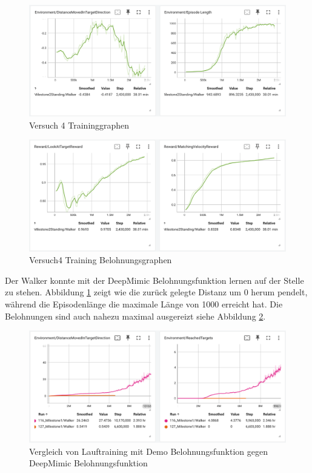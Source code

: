 \begin{figure}[H]
  \centering  
  \includegraphics[scale=0.5]{img/versuch4_training}
  \caption{Versuch 4 Traininggraphen}
  \label{fig:versuch4_training}
\end{figure}

\begin{figure}[H]
  \centering  
  \includegraphics[scale=0.5]{img/versuch4_training_belohnung}
  \caption{Versuch4 Training Belohnungsgraphen}
  \label{fig:versuch4_training_belohnung}
\end{figure}

Der Walker konnte mit der DeepMimic Belohnungsfunktion lernen auf der Stelle zu stehen.  Abbildung \ref{fig:versuch4_training} zeigt wie die zurück gelegte Distanz um 0 herum pendelt, während die Episodenlänge die maximale Länge von 1000 erreicht hat. Die Belohnungen sind auch nahezu maximal ausgereizt siehe Abbildung \ref{fig:versuch4_training_belohnung}.

\begin{figure}[H]
  \centering  
  \includegraphics[scale=0.5]{img/versuch4_laufen_vergleich.png}
  \caption{Vergleich von Lauftraining mit Demo Belohnungsfunktion gegen DeepMimic Belohnungsfunktion}
  \label{fig:versuch4_laufen_vergleich}
\end{figure}

